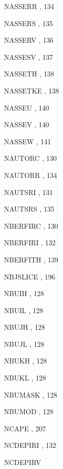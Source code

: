 \begin{theindex}
  \item NASSERR
    \subitem {},  134
  \item NASSERS
    \subitem {},  135
  \item NASSERV
    \subitem {},  136
  \item NASSESV
    \subitem {},  137
  \item NASSETH
    \subitem {},  138
  \item NASSETKE
    \subitem {},  138
  \item NASSEU
    \subitem {},  140
  \item NASSEV
    \subitem {},  140
  \item NASSEW
    \subitem {},  141
  \item NAUTORC
    \subitem {},  130
  \item NAUTORR
    \subitem {},  134
  \item NAUTSRI
    \subitem {},  131
  \item NAUTSRS
    \subitem {},  135
  \item NBERFIRC
    \subitem {},  130
  \item NBERFIRI
    \subitem {},  132
  \item NBERFITH
    \subitem {},  139
  \item NBJSLICE
    \subitem {},  196
  \item NBUIH
    \subitem {},  128
  \item NBUIL
    \subitem {},  128
  \item NBUJH
    \subitem {},  128
  \item NBUJL
    \subitem {},  128
  \item NBUKH
    \subitem {},  128
  \item NBUKL
    \subitem {},  128
  \item NBUMASK
    \subitem {},  128
  \item NBUMOD
    \subitem {},  128
  \item NCAPE
    \subitem {},  207
  \item NCDEPIRI
    \subitem {},  132
  \item NCDEPIRV

\end{theindex}
